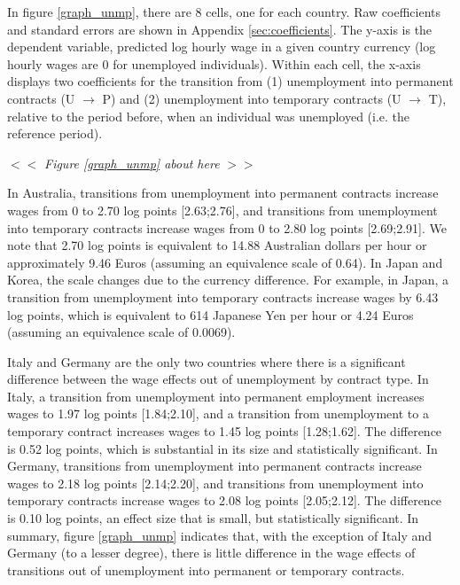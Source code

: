 \documentclass[12pt]{article}
\begin{document}
In figure \ref{graph_unmp}, there are 8 cells, one for each country.  Raw coefficients and standard errors are shown in Appendix \ref{sec:coefficients}.  The y-axis is the dependent variable, predicted log hourly wage in a given country currency (log hourly wages are 0 for unemployed individuals).  Within each cell, the x-axis displays two coefficients for the transition from (1) unemployment into permanent contracts (U $\rightarrow$ P) and (2) unemployment into temporary contracts (U $\rightarrow$ T), relative to the period before, when an individual was unemployed (i.e. the reference period).  

\begin{center}
$<<$ \emph{Figure \ref{graph_unmp} about here} $>>$
\end{center}

In Australia, transitions from unemployment into permanent contracts increase wages from 0 to 2.70 log points [2.63;2.76], and transitions from unemployment into temporary contracts increase wages from 0 to 2.80 log points [2.69;2.91].  We note that 2.70 log points is equivalent to 14.88 Australian dollars per hour or approximately 9.46 Euros (assuming an equivalence scale of 0.64).  In Japan and Korea, the scale changes due to the currency difference.  For example, in Japan, a transition from unemployment into temporary contracts increase wages by 6.43 log points, which is equivalent to 614 Japanese Yen per hour or 4.24 Euros (assuming an equivalence scale of 0.0069).

Italy and Germany are the only two countries where there is a significant difference between the wage effects out of unemployment by contract type.  In Italy, a transition from unemployment into permanent employment increases wages to 1.97 log points [1.84;2.10], and a transition from unemployment to a temporary contract increases wages to 1.45 log points [1.28;1.62].  The difference is 0.52 log points, which is substantial in its size and statistically significant.  In Germany, transitions from unemployment into permanent contracts increase wages to 2.18 log points [2.14;2.20], and transitions from unemployment into temporary contracts increase wages to 2.08 log points [2.05;2.12].  The difference is 0.10 log points, an effect size that is small, but statistically significant.  In summary, figure \ref{graph_unmp} indicates that, with the exception of Italy and Germany (to a lesser degree), there is little difference in the wage effects of transitions out of unemployment into permanent or temporary contracts.
\end{document}

